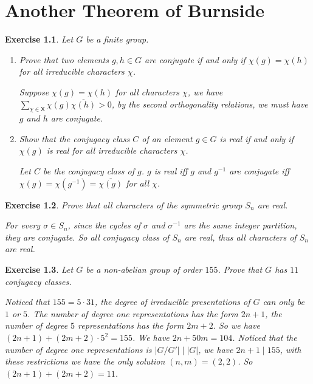\documentclass[11pt]{report}
\theoremstyle{mythm}
\let\oldendproof\endproof
\renewenvironment{proof}[1][\proofname]{%
  \oldproof[\normalfont \bfseries #1]%
}{\oldendproof}
\newtheorem{exercise}{Exercise}[chapter]
\renewcommand*{\proofname}{Proof}
\theoremstyle{myans}
\begin{document}
\setcounter{chapter}{8}
\chapter{Another Theorem of Burnside}

\begin{exercise}
  Let $G$ be a finite group.
  \begin{enumerate}
    \item Prove that two elements $g, h \in G$ are conjugate if and only
    if $\chi(g) = \chi(h)$ for all irreducible characters $\chi$.
    \begin{proof}
      Suppose $\chi(g) = \chi(h)$ for all characters $\chi$, we have
      $\sum_{\chi \in \mathsf{X}} \chi(g)\overline{\chi(h)} > 0$,
      by the second orthogonality relations, we must have $g$ and $h$ are conjugate.
    \end{proof}
    \item Show that the conjugacy class $C$ of an element $g \in G$ is real if and only if $\chi(g)$
    is real for all irreducible characters $\chi$.
    \begin{proof}
      Let $C$ be the conjugacy class of $g$. $g$ is real iff $g$ and $g^{-1}$ are conjugate
      iff $\chi(g) = \chi(g^{-1}) = \overline{\chi(g)}$ for all $\chi$.
    \end{proof}
  \end{enumerate}
\end{exercise}

\begin{exercise}
  Prove that all characters of the symmetric group $S_n$ are real.
  \begin{proof}
    For every $\sigma\in S_n$, since the cycles of $\sigma$ and $\sigma^{-1}$ are the same
    integer partition, they are conjugate. So all conjugacy class of $S_n$ are real, thus all
    characters of $S_n$ are real.
  \end{proof}
\end{exercise}

\begin{exercise}
  Let $G$ be a non-abelian group of order $155$. Prove that $G$ has $11$ conjugacy classes.
  \begin{proof}
    Noticed that $155 = 5\cdot 31$, the degree of irreducible presentations of $G$ can only be
    $1$ or $5$. The number of degree one representations has the form $2n+1$,
    the number of degree $5$ representations has the form $2m + 2$. So we have
    $(2n+1) + (2m+2)\cdot 5^2 = 155$. We have $2n+50m = 104$. Noticed that the number of
    degree one representations is $|G/G'| \mid |G|$, we have $2n+1 \mid 155$, with these restrictions
    we have the only solution $(n, m) = (2, 2)$. So $(2n+1) + (2m+2) = 11$.
  \end{proof}
\end{exercise}
\end{document}
